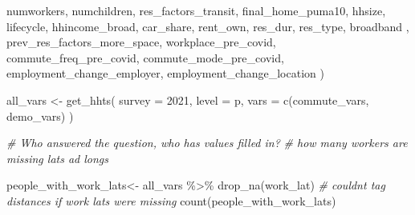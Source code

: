\documentclass[
]{article}
\newenvironment{Shaded}{\begin{snugshade}}{\end{snugshade}}
\newcommand{\AttributeTok}[1]{\textcolor[rgb]{0.77,0.63,0.00}{#1}}
\newcommand{\CommentTok}[1]{\textcolor[rgb]{0.56,0.35,0.01}{\textit{#1}}}
\newcommand{\FunctionTok}[1]{\textcolor[rgb]{0.00,0.00,0.00}{#1}}
\newcommand{\NormalTok}[1]{#1}
\newcommand{\OtherTok}[1]{\textcolor[rgb]{0.56,0.35,0.01}{#1}}
\newcommand{\SpecialCharTok}[1]{\textcolor[rgb]{0.00,0.00,0.00}{#1}}
\newcommand{\StringTok}[1]{\textcolor[rgb]{0.31,0.60,0.02}{#1}}
\begin{document}
\begin{Shaded}
\begin{Highlighting}[]
    \StringTok{\textquotesingle{}numworkers\textquotesingle{}}\NormalTok{,}
    \StringTok{\textquotesingle{}numchildren\textquotesingle{}}\NormalTok{,}
    \StringTok{\textquotesingle{}res\_factors\_transit\textquotesingle{}}\NormalTok{,}
    \StringTok{\textquotesingle{}final\_home\_puma10\textquotesingle{}}\NormalTok{,}
    \StringTok{\textquotesingle{}hhsize\textquotesingle{}}\NormalTok{,}
    \StringTok{\textquotesingle{}lifecycle\textquotesingle{}}\NormalTok{,}
    \StringTok{\textquotesingle{}hhincome\_broad\textquotesingle{}}\NormalTok{,}
    \StringTok{\textquotesingle{}car\_share\textquotesingle{}}\NormalTok{,}
    \StringTok{\textquotesingle{}rent\_own\textquotesingle{}}\NormalTok{,}
    \StringTok{\textquotesingle{}res\_dur\textquotesingle{}}\NormalTok{,}
    \StringTok{\textquotesingle{}res\_type\textquotesingle{}}\NormalTok{,}
    \StringTok{\textquotesingle{}broadband\textquotesingle{}}\NormalTok{ ,}
    \StringTok{\textquotesingle{}prev\_res\_factors\_more\_space\textquotesingle{}}\NormalTok{,}
    \StringTok{\textquotesingle{}workplace\_pre\_covid\textquotesingle{}}\NormalTok{,}
    \StringTok{\textquotesingle{}commute\_freq\_pre\_covid\textquotesingle{}}\NormalTok{,}
    \StringTok{\textquotesingle{}commute\_mode\_pre\_covid\textquotesingle{}}\NormalTok{,}
    \StringTok{\textquotesingle{}employment\_change\_employer\textquotesingle{}}\NormalTok{,}
    \StringTok{\textquotesingle{}employment\_change\_location\textquotesingle{}}
\NormalTok{  )}


\NormalTok{all\_vars }\OtherTok{\textless{}{-}} \FunctionTok{get\_hhts}\NormalTok{(}
  \AttributeTok{survey =} \StringTok{\textquotesingle{}2021\textquotesingle{}}\NormalTok{,}
  \AttributeTok{level =} \StringTok{\textquotesingle{}p\textquotesingle{}}\NormalTok{,}
  \AttributeTok{vars =} \FunctionTok{c}\NormalTok{(commute\_vars, demo\_vars)}
\NormalTok{)}
\end{Highlighting}
\end{Shaded}

\begin{Shaded}
\begin{Highlighting}[]
\CommentTok{\# Who answered the question, who has values filled in?}
\CommentTok{\# how many workers are missing lats ad longs}

\NormalTok{people\_with\_work\_lats}\OtherTok{\textless{}{-}}\NormalTok{ all\_vars }\SpecialCharTok{\%\textgreater{}\%} \FunctionTok{drop\_na}\NormalTok{(work\_lat)}
\CommentTok{\# couldn\textquotesingle{}t tag distances if work lats were missing}
\FunctionTok{count}\NormalTok{(people\_with\_work\_lats)}
\end{Highlighting}
\end{Shaded}
\end{document}
